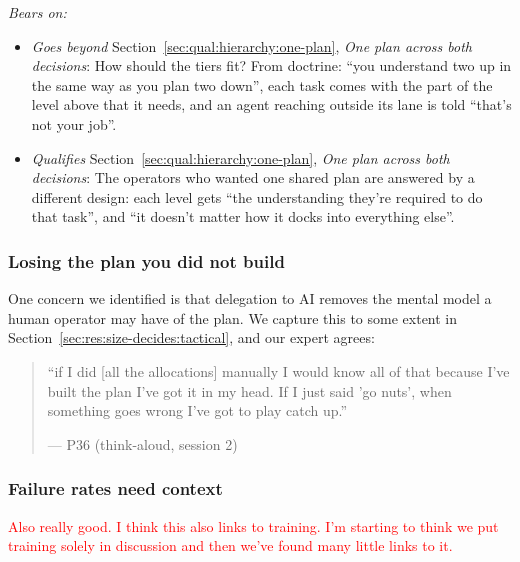 \noindent\textit{Bears on:}
\begin{itemize}[leftmargin=1.2em,itemsep=1pt]\small
\item \textit{Goes beyond} Section~\ref{sec:qual:hierarchy:one-plan}, \emph{One plan across both decisions}: How should the tiers fit? From doctrine: ``you understand two up in the same way as you plan two down'', each task comes with the part of the level above that it needs, and an agent reaching outside its lane is told ``that's not your job''.
\item \textit{Qualifies} Section~\ref{sec:qual:hierarchy:one-plan}, \emph{One plan across both decisions}: The operators who wanted one shared plan are answered by a different design: each level gets ``the understanding they're required to do that task'', and ``it doesn't matter how it docks into everything else''.
\end{itemize}

\subsubsection{Losing the plan you did not build}\label{sec:qual:practitioner:pt-play-catch-up}

One concern we identified is that delegation to AI removes the mental model a human operator may have of the plan. We capture this to some extent in Section~\ref{sec:res:size-decides:tactical}, and our expert agrees:

\begin{quote}\small
``if I did [all the allocations] manually I would know all of that because I've built the plan I've got it in my head. If I just said 'go nuts', when something goes wrong I've got to play catch up.''\par\hfill--- P36 (think-aloud, session 2)
\end{quote}

\subsubsection{Failure rates need context}\label{sec:qual:practitioner:pt-failure-rate}

\textcolor{red}{Also really good. I think this also links to training. I'm starting to think we put training solely in discussion and then we've found many little links to it.}

